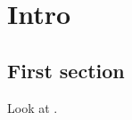 \chapter{Intro}

\section{First section}

Look at \cite{
    CarrollMereo,
    ColafrancheschiPhD,
    szpak2014curved,
    Josset_2017_thermo,
    EinsteinFromEntanglement,
    speranza2018eeg,
    GRQO_2020,
    Shore_QGO,
    OQEG,
    QSimCurved,
    SpacetimeFromEntanglement,
}.